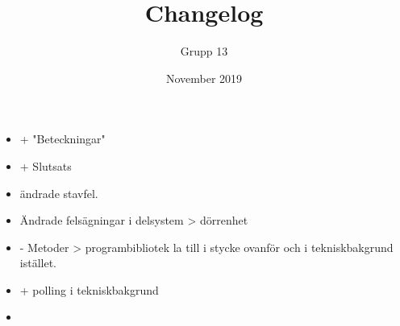 \documentclass{article}
\title{Changelog}
\author{Grupp 13}
\date{November 2019}
\begin{document}
\maketitle
\begin{itemize}
    \item + "Beteckningar"
    \item + Slutsats
    \item ändrade stavfel.
    \item Ändrade felsägningar i delsystem > dörrenhet
    \item - Metoder > programbibliotek la till i stycke ovanför och i tekniskbakgrund istället.
    \item + polling i tekniskbakgrund
    \item 
\end{itemize}
\end{document}
